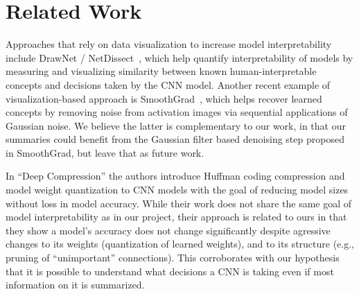 \section{Related Work}
\label{s:related_work}

 Approaches that rely on data visualization to increase model interpretability include DrawNet / NetDissect~\cite{netdissect_2017}, which help quantify interpretability of models by measuring and visualizing similarity between known human-interpretable concepts and decisions taken by the CNN model. Another recent example of visualization-based approach is SmoothGrad~\cite{smoothgrad_2017}, which helps recover learned concepts by removing noise from activation images via sequential applications of Gaussian noise.  We believe the latter is complementary to our work, in that our summaries could benefit from the Gaussian filter based denoising step proposed in SmoothGrad, but leave that as future work.

 In ``Deep Compression'' \cite{deepCompression_2015} the authors introduce Huffman coding compression and model weight quantization to CNN models with the goal of reducing model sizes without loss in model accuracy.  While their work does not share the same goal of model interpretability as in our project, their approach is related to ours in that they show a model's accuracy does not change significantly despite agressive changes to its weights (quantization of learned weights), and to its structure (e.g., pruning of ``unimportant'' connections).  This corroborates with our hypothesis that it is possible to understand what decisions a CNN is taking even if most information on it is summarized.
